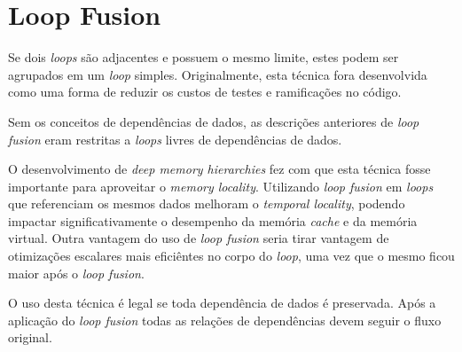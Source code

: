 
\section{Loop Fusion}

Se dois \textit{loops} são adjacentes e possuem o mesmo limite, estes podem
ser agrupados em um \textit{loop} simples.
Originalmente, esta técnica fora desenvolvida como uma forma de reduzir os
custos de testes e ramificações no código.

Sem os conceitos de dependências de dados, as descrições anteriores de
\textit{loop fusion} eram restritas a \textit{loops} livres de dependências de
dados. 

O desenvolvimento de \textit{deep memory hierarchies} fez com que esta técnica
fosse importante para aproveitar o \textit{memory locality}.
Utilizando \textit{loop fusion} em \textit{loops} que referenciam os mesmos
dados melhoram o \textit{temporal locality}, podendo impactar significativamente  
o desempenho da memória \textit{cache} e da memória virtual.
Outra vantagem do uso de \textit{loop fusion} seria tirar vantagem de otimizações 
escalares mais eficiêntes no corpo do \textit{loop}, uma vez que o mesmo ficou
maior após o \textit{loop fusion}.

O uso desta técnica é legal se toda dependência de dados é preservada. Após a
aplicação do \textit{loop fusion} todas as relações de dependências devem seguir
o fluxo original.



